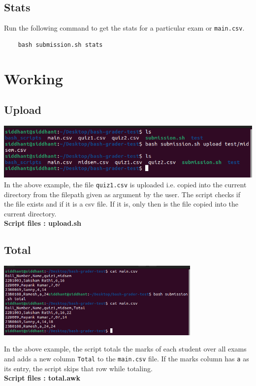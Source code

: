\documentclass{article}
\begin{document}
\subsection{Stats}
Run the following command to get the stats for a particular exam or \verb"main.csv".
\begin{verbatim}
    bash submission.sh stats
\end{verbatim}


\section{Working}
\subsection{Upload}
\includegraphics[width=\textwidth]{upload.png}
In the above example, the file \verb"quiz1.csv" is uploaded i.e. copied into the current directory from the filepath given as argument by the user.
The script checks if the file exists and if it is a csv file. If it is, only then is the file copied into the current directory.\\
\textbf{Script files : upload.sh }


\subsection{Total}
\begin{center}
    \includegraphics[width=10cm]{total.png}
\end{center}
In the above example, the script totals the marks of each student over all exams and adds a new column \verb"Total" to the \verb"main.csv" file.
If the marks column has \verb"a" as its entry, the script skips that row while totaling.\\
\textbf{Script files : total.awk }
\end{document}
